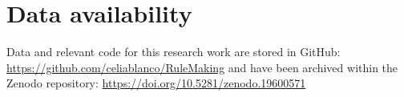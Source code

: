 \section*{Data availability}
Data and relevant code for this research work are stored in GitHub: \url{https://github.com/celiablanco/RuleMaking} and have been archived within the Zenodo repository: \url{https://doi.org/10.5281/zenodo.19600571}
